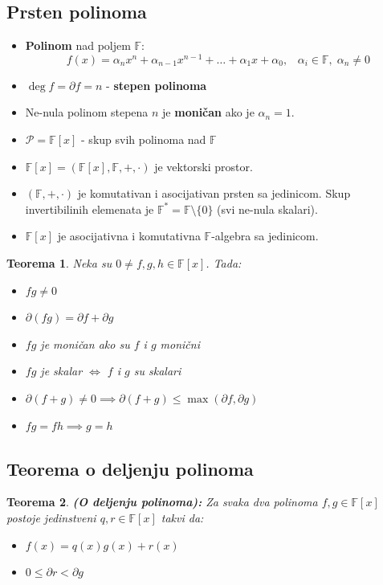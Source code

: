 \documentclass[a4paper,12pt,twoside]{report}
\newtheorem{theorem}{Teorema}[section]
\numberwithin{algorithm}{section}
\begin{document}
\subsection{Prsten polinoma}
\begin{itemize}
    \item \textbf{Polinom} nad poljem $\mathbb{F}$:
    \[ f(x) = \alpha_nx^n + \alpha_{n-1}x^{n-1}+ \dots + \alpha_1x + \alpha_0, \;\;\; \alpha_i \in \mathbb{F},\; \alpha_n \neq 0 \]
    \item $\deg f = \partial f = n$ - \textbf{stepen polinoma}
    \item Ne-nula polinom stepena $n$ je \textbf{moničan} ako je $\alpha_n = 1$.
    \item $\mathcal{P} = \mathbb{F}[x]$ - skup svih polinoma nad $\mathbb{F}$
    \item $\mathbb{F}[x] = (\mathbb{F}[x], \mathbb{F}, +, \cdot)$ je vektorski prostor.
    \item $(\mathbb{F}, +, \cdot)$ je komutativan i asocijativan prsten sa jedinicom. Skup invertibilinih elemenata je $\mathbb{F}^* = 
    \mathbb{F}\setminus \{0\}$ (svi ne-nula skalari).
    \item $\mathbb{F}[x]$ je asocijativna i komutativna $\mathbb{F}$-algebra sa jedinicom.
\end{itemize}

\begin{theorem}
    Neka su $0 \neq f, g, h \in \mathbb{F}[x]$. Tada:
    \begin{itemize}
        \item $fg \neq 0$
        \item $\partial(fg) = \partial f + \partial g$
        \item $fg$ je moničan ako su $f$ i $g$ monični
        \item $fg$ je skalar $\iff$ $f$ i $g$ su skalari
        \item $\partial(f + g) \neq 0 \implies \partial(f + g) \leq \max (\partial f, \partial g)$
        \item $fg = fh \implies g = h$
    \end{itemize}
\end{theorem}

\subsection{Teorema o deljenju polinoma}
\begin{theorem}
    \textbf{(O deljenju polinoma):} Za svaka dva polinoma $f, g \in \mathbb{F}[x]$ postoje jedinstveni $q, r \in \mathbb{F}[x]$ takvi da:
    \begin{itemize}
        \item $f(x) = q(x)g(x) + r(x)$
        \item $0 \leq \partial r < \partial g$
    \end{itemize}
\end{theorem}
\end{document}
